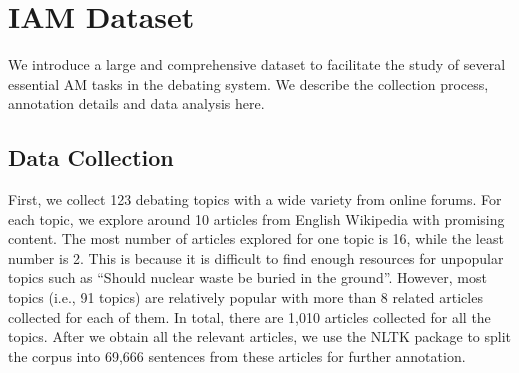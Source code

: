 \documentclass[11pt]{article}
\begin{document}
\section{IAM Dataset}

We introduce a large and comprehensive dataset to facilitate the study of several essential AM tasks in the debating system.
We describe the collection process, annotation details and data analysis here.

\subsection{Data Collection}

First, we collect 123 debating topics with a wide variety from online forums. 
For each topic, we explore around 10 articles from English Wikipedia with promising content.
The most number of articles explored for one topic is 16, while the least number is 2.
This is because it is difficult to find enough resources for unpopular topics such as ``Should nuclear waste be buried in the ground''.
However, most topics (i.e., 91 topics) are relatively popular with more than 8 related articles collected for each of them.
In total, there are 1,010 articles collected for all the topics.
After we obtain all the relevant articles, we use the NLTK package \cite{bird2009natural} to split the corpus into 69,666 sentences from these articles for further annotation.





\begin{table*}[t!]
	\centering
{}
\caption{Overall statistics comparison of the existing datasets and our dataset. 
Note that: (1) in \citet{aharoni2014benchmark}'s dataset, the numbers in the parenthesis refer to the evidence labeling data; (2) the numbers with * are calculated by us since they are not shown in the original papers.}
	\label{tab:data2}
\end{table*}
\end{document}
